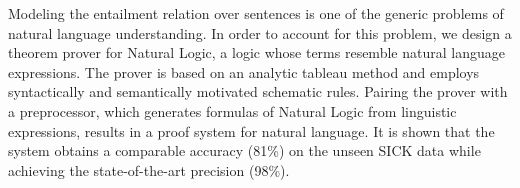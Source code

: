 Modeling the entailment relation over sentences is one of the generic problems of natural language understanding. In order to account for this problem, we design a theorem prover for Natural Logic, a logic whose terms resemble natural language expressions. The prover is based on an analytic tableau method and employs syntactically and semantically motivated schematic rules. Pairing the prover with a preprocessor, which generates formulas of Natural Logic from linguistic expressions, results in a proof system for  natural language. It is shown that the system obtains a comparable accuracy (81\%) on the unseen SICK data while achieving the state-of-the-art precision (98\%).
